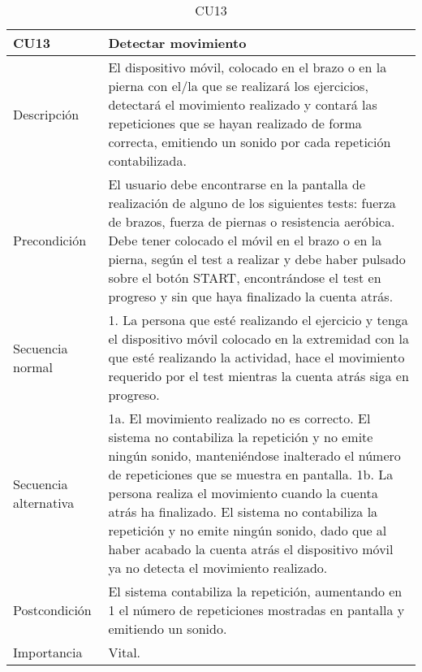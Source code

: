 \begin{table}[H]
\label{CU13}
\begin{center}
\begin{tabular}{| l | p{10cm} |}
\hline
CU13 & Detectar movimiento\\
\hline
Descripción & El dispositivo móvil, colocado en el brazo o en la pierna con el/la que se realizará los ejercicios, detectará el movimiento realizado y contará las repeticiones que se hayan realizado de forma correcta, emitiendo un sonido por cada repetición contabilizada.\\
\hline
Precondición & El usuario debe encontrarse en la pantalla de realización de alguno de los siguientes tests: fuerza de brazos, fuerza de piernas o resistencia aeróbica. Debe tener colocado el móvil en el brazo o en la pierna, según el test a realizar y debe haber pulsado sobre el botón START, encontrándose el test en progreso y sin que haya finalizado la cuenta atrás.\\
\hline
Secuencia normal & 1. La persona que esté realizando el ejercicio y tenga el dispositivo móvil colocado en la extremidad con la que esté realizando la actividad, hace el movimiento requerido por el test mientras la cuenta atrás siga en progreso.\\
\hline
Secuencia alternativa & 1a. El movimiento realizado no es correcto. El sistema no contabiliza la repetición y no emite ningún sonido, manteniéndose inalterado el número de repeticiones que se muestra en pantalla.
\newline 1b. La persona realiza el movimiento cuando la cuenta atrás ha finalizado. El sistema no contabiliza la repetición y no emite ningún sonido, dado que al haber acabado la cuenta atrás el dispositivo móvil ya no detecta el movimiento realizado.\\
\hline
Postcondición & El sistema contabiliza la repetición, aumentando en 1 el número de repeticiones mostradas en pantalla y emitiendo un sonido.\\
\hline
Importancia & Vital.\\
\hline
\end{tabular}
\end{center}
\caption{CU13}
\end{table}

